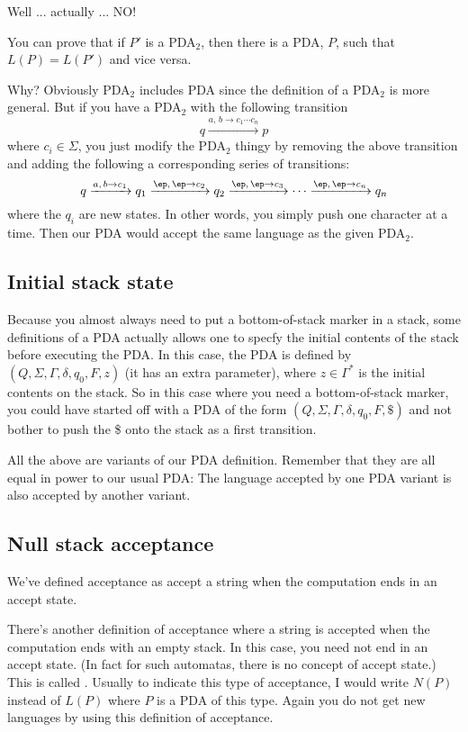 Well ... actually ... NO!

You can prove that if $P'$ is a PDA$_2$, then there is a PDA, $P$, such that
$L(P) = L(P')$ and vice versa.

Why? 
Obviously PDA$_2$ includes PDA since the definition of a PDA$_2$ is more
general.
But if you have a PDA$_2$ with the following transition
\[
q \xrightarrow{a, \, b \rightarrow c_1 \cdots c_n} p 
\]
where $c_i \in \Sigma$, you just modify the PDA$_2$ 
thingy by removing the above transition and adding the
following a corresponding 
series of transitions:
\[
q 
\xrightarrow{a, \, b \rightarrow c_1} q_1 
\xrightarrow{\ep, \, \ep \rightarrow c_2} q_2
\xrightarrow{\ep, \, \ep \rightarrow c_3}
\cdots  
\xrightarrow{\ep, \, \ep \rightarrow c_n} q_n 
\]
where the $q_i$ are new states.
In other words, you simply push one character at a time.
Then our PDA would accept the same language as the given PDA$_2$.



\newpage
\subsection{Initial stack state}

Because you almost always need to put a bottom-of-stack marker in a stack,
some definitions of a PDA actually allows one to specfy the initial contents
of the stack before executing the PDA.
In this case, the PDA is defined by $(Q, \Sigma, \Gamma, \delta, q_0, F, z)$
(it has an extra parameter), where $z \in \Gamma^*$ is the initial contents
on the stack.
So in this case where you need a bottom-of-stack marker, you could have 
started off with a PDA of the form $(Q, \Sigma, \Gamma, \delta, q_0, F, \$)$
and not bother to push the \$ onto the stack as a first transition.

All the above are variants of our PDA definition.
Remember that they are all equal in power to our usual PDA:
The language accepted by one PDA variant is also accepted by another variant.



\newpage
\subsection{Null stack acceptance}

We've defined acceptance as accept a string when the computation ends in an
accept state.

There's another definition of acceptance where a string is accepted when the 
computation ends with an empty stack. 
In this case, you need not end in an accept state.
(In fact for such automatas, there is no concept of accept state.)
This is called .
Usually to indicate this type of acceptance, I would write $N(P)$
instead of $L(P)$ where $P$ is a PDA of this type.
Again you do not get new languages by using this definition of acceptance.


